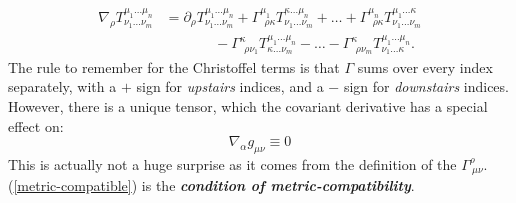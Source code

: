 \begin{itemize}
    \begin{equation}
    \begin{split}
        \nabla_{\rho}T^{\mu_{1}\dots\mu_{n}}_{\nu_{1}\dots\nu_{m}} &= \partial_{\rho}T^{\mu_{1}\dots\mu_{n}}_{\nu_{1}\dots\nu_{m}} + \Gamma_{\ \ \rho\kappa}^{\mu_{1}}T^{\kappa\dots\mu_{n}}_{\nu_{1}\dots\nu_{m}}+\dots + \Gamma_{\ \ \rho\kappa}^{\mu_{n}}T^{\mu_{1}\dots\kappa}_{\nu_{1}\dots\nu_{m}}\\
        &\ \ \ \ \ \ \ \ \ \ \ \ \ \ \ \ - \Gamma_{\ \ \rho\nu_{1}}^{\kappa}T^{\mu_{1}\dots\mu_n}_{\kappa\dots\nu_{m}}-\dots - \Gamma_{\ \ \rho\nu_m}^{\kappa}T^{\mu_{1}\dots\mu_n}_{\nu_1\dots\kappa}.
    \end{split}
    \end{equation}
    The rule to remember for the Christoffel terms is that $\Gamma$ sums over every index separately, with a $+$ sign for \textit{upstairs} indices, and a $-$ sign for \textit{downstairs} indices. However, there is a unique tensor, which the covariant derivative has a special effect on: 
    \begin{equation}\label{metric-compatible}
        \nabla_{\alpha}g_{\mu\nu} \equiv 0
    \end{equation}
    This is actually not a huge surprise as it comes from the definition of the $\Gamma^{\rho}_{\ \mu\nu}$. (\ref{metric-compatible}) is the \textbf{\textit{condition of metric-compatibility}}.
\end{itemize}
